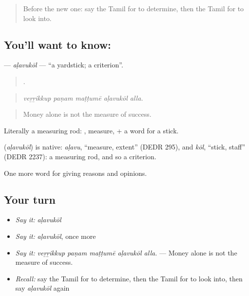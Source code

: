 \label{lesson:TA-C361-alavukol}



\begin{quote}
Before the new one: say the Tamil for to determine, then the Tamil for to look into.
\end{quote}

\subsection*{You'll want to know: }
\textbf{} — \emph{aḷavukōl} — \textquotedblleft{}a yardstick; a criterion\textquotedblright{}.

\begin{quote}
    .
\end{quote}

\begin{quote}
\emph{veṟṟikkup paṇam maṭṭumē aḷavukōl alla.}
\end{quote}

\begin{quote}
Money alone is not the measure of success.
\end{quote}

Literally a measuring rod: , measure, + a word for a stick.

\begin{cousinweb}
\textbf{} (\emph{aḷavukōl}) is native: \emph{aḷavu}, \textquotedblleft{}measure, extent\textquotedblright{} (DEDR 295), and \emph{kōl}, \textquotedblleft{}stick, staff\textquotedblright{} (DEDR 2237): a measuring rod, and so a criterion.
\end{cousinweb}

\begin{grammarlens}[title={What you've built}]
One more word for giving reasons and opinions.
\end{grammarlens}

\subsection*{Your turn}
\begin{itemize}
\raggedright
  \item \emph{Say it:} \emph{aḷavukōl}
  \item \emph{Say it:} \emph{aḷavukōl}, once more
  \item \emph{Say it:} \emph{veṟṟikkup paṇam maṭṭumē aḷavukōl alla.} — Money alone is not the measure of success.
  \item \emph{Recall:} say the Tamil for to determine, then the Tamil for to look into, then say \emph{aḷavukōl} again
\end{itemize}

